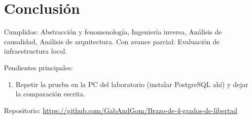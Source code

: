 \documentclass[a4paper,11pt]{article}
\begin{document}
\section{Conclusión}
Cumplidos: Abstracción y fenomenología, Ingeniería inversa, Análisis de causalidad, Análisis de arquitectura. Con avance parcial: Evaluación de infraestructura local.
\par\smallskip Pendientes principales:
\begin{enumerate}
\item Repetir la prueba en la PC del laboratorio (instalar PostgreSQL ahí) y dejar la comparación escrita.
\end{enumerate}
\par\smallskip\noindent Repositorio: \url{https://github.com/GabAndGom/Brazo-de-4-grados-de-libertad}
\end{document}
